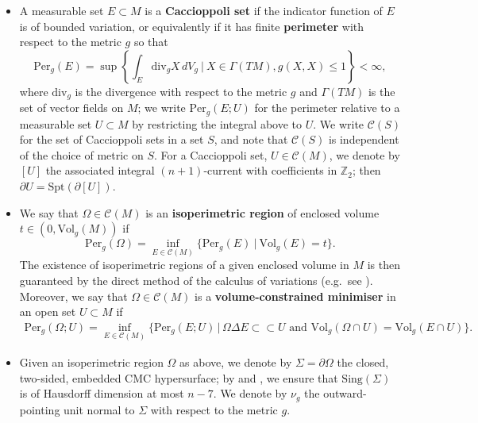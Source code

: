\documentclass[12pt]{article}
\begin{document}
\begin{itemize}
    \item A measurable set $E \subset M$ is a \textbf{Caccioppoli set} if the indicator function of $E$ is of bounded variation, or equivalently if it has finite \textbf{perimeter} with respect to the metric $g$ so that
     \begin{equation*}
        \mathrm{Per}_g(E) = \sup \left\{\int_E \mathrm{div}_g X \, dV_g \: \bigg| \: X \in \Gamma(TM), g(X,X) \leq 1 \right\} < \infty,
     \end{equation*}
     where $\mathrm{div}_g$ is the divergence with respect to the metric $g$ and $\Gamma(TM)$ is the set of vector fields on $M$; we write $\mathrm{Per}_g(E;U)$ for the perimeter relative to a measurable set $U \subset M$ by restricting the integral above to $U$. We write $\mathcal{C}(S)$ for the set of Caccioppoli sets in a set $S$, and note that $\mathcal{C}(S)$ is independent of the choice of metric on $S$. For a Caccioppoli set, $U \in \mathcal{C}(M)$, we denote by $[U]$ the associated integral $(n+1)$-current with coefficients in $\mathbb Z_2$; then $\partial U =\mathrm{Spt}(\partial[U])$.

     \item We say that $\Omega \in \mathcal{C}(M)$ is an \textbf{isoperimetric region} of enclosed volume $t \in (0,\mathrm{Vol}_g(M))$ if
     \begin{equation*}
        \mathrm{Per}_g(\Omega ) = \inf_{E \in \mathcal{C}(M)}\{\mathrm{Per}_g(E) \: | \: \mathrm{Vol}_g(E) = t\}.
     \end{equation*}
     The existence of isoperimetric regions of a given enclosed volume in $M$ is then guaranteed by the direct method of the calculus of variations (e.g.~see \cite[Section 13.2]{M16}). Moreover, we say that $\Omega \in \mathcal{C}(M)$ is a \textbf{volume-constrained minimiser} in an open set $U \subset M$ if 
     \begin{align*}
        \mathrm{Per}_g(\Omega; U ) = \inf_{E\in \mathcal{C}(M)} \{\mathrm{Per}_g(E; U) \, | \, \Omega \Delta E \subset \subset U \text{ and  } \mathrm{Vol}_g(\Omega\cap U) = \mathrm{Vol}_g(E\cap U) \}.
    \end{align*}
       
     \item Given an isoperimetric region $\Omega$ as above, we denote by $\Sigma =\partial \Omega$ the closed, two-sided, embedded CMC hypersurface; by \cite{GMT83} and \cite{M03}, we ensure that $\mathrm{Sing}(\Sigma)$ is of Hausdorff dimension at most $n-7$. We denote by $\nu_g$ the outward-pointing unit normal to $\Sigma$ with respect to the metric $g$.


\end{itemize}
\end{document}
